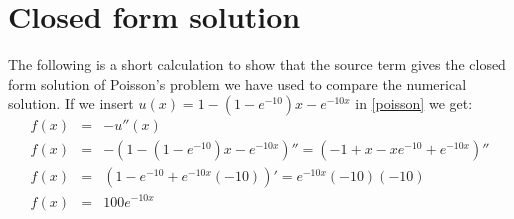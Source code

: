 \documentclass[a4paper, english]{amsart} %
\begin{document}
\section{Closed form solution}
The following is a short calculation to show that the source term gives the closed form solution of Poisson's problem we have used to compare the numerical solution.
\label{Sec_CFS}
If we insert $u(x) = 1 - (1-e^{-10})x - e^{-10x}$ in \eqref{poisson} we get:
\begin{eqnarray*}
	f(x) &=& -u''(x) \\
	f(x) &=& - \left(1 - (1-e^{-10})x - e^{-10x}\right)'' = \left( -1 + x - xe^{-10} + e^{-10x} \right)'' \\
	f(x) &=& \left(1 - e^{-10} + e^{-10x}(-10) \right)' = e^{-10x}(-10)(-10) \\
	f(x) &=& 100e^{-10x}
\end{eqnarray*}
\end{document}
